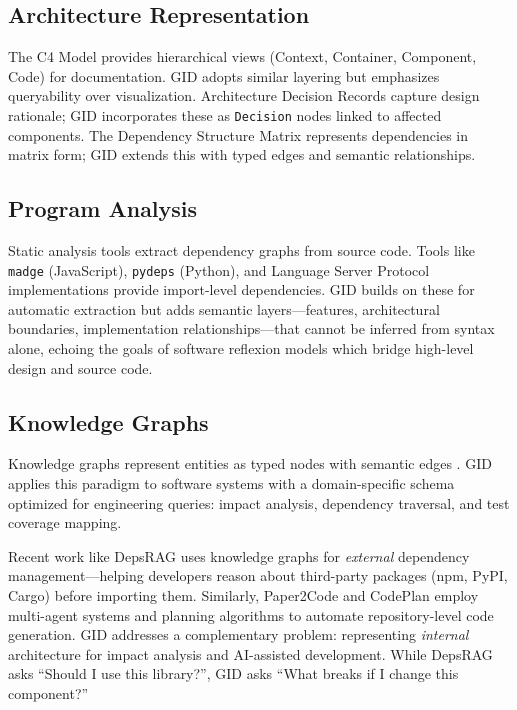 \documentclass[11pt,a4paper]{article}
\begin{document}
\subsection{Architecture Representation}

The C4 Model \cite{c4model} provides hierarchical views (Context, Container, Component, Code) for documentation. GID adopts similar layering but emphasizes queryability over visualization. Architecture Decision Records \cite{nygard2011} capture design rationale; GID incorporates these as \texttt{Decision} nodes linked to affected components. The Dependency Structure Matrix \cite{eppinger2012} represents dependencies in matrix form; GID extends this with typed edges and semantic relationships.

\subsection{Program Analysis}

Static analysis tools extract dependency graphs from source code. Tools like \texttt{madge} \cite{madge} (JavaScript), \texttt{pydeps} (Python), and Language Server Protocol implementations provide import-level dependencies. GID builds on these for automatic extraction but adds semantic layers---features, architectural boundaries, implementation relationships---that cannot be inferred from syntax alone, echoing the goals of software reflexion models \cite{murphy1995reflexion} which bridge high-level design and source code.

\subsection{Knowledge Graphs}

Knowledge graphs represent entities as typed nodes with semantic edges \cite{hogan2021}. GID applies this paradigm to software systems with a domain-specific schema optimized for engineering queries: impact analysis, dependency traversal, and test coverage mapping.

Recent work like DepsRAG \cite{depsrag2024} uses knowledge graphs for \emph{external} dependency management---helping developers reason about third-party packages (npm, PyPI, Cargo) before importing them. Similarly, Paper2Code \cite{paper2code2025} and CodePlan \cite{codeplan2023} employ multi-agent systems and planning algorithms to automate repository-level code generation. GID addresses a complementary problem: representing \emph{internal} architecture for impact analysis and AI-assisted development. While DepsRAG asks ``Should I use this library?'', GID asks ``What breaks if I change this component?''
\end{document}
